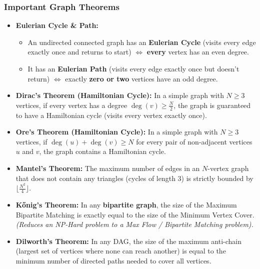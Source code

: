 \subsubsection*{Important Graph Theorems}
\begin{itemize}
    \item \textbf{Eulerian Cycle \& Path: } 
        \begin{itemize}
            \item An undirected connected graph has an \textbf{Eulerian Cycle} (visits every edge exactly once and returns to start) $\iff$ \textbf{every} vertex has an even degree.
            \item It has an \textbf{Eulerian Path} (visits every edge exactly once but doesn't return) $\iff$ exactly \textbf{zero or two} vertices have an odd degree.
        \end{itemize}
    \item \textbf{Dirac's Theorem (Hamiltonian Cycle): } In a simple graph with $N \ge 3$ vertices, if every vertex has a degree $\deg(v) \ge \frac{N}{2}$, the graph is guaranteed to have a Hamiltonian cycle (visits every vertex exactly once).
    \item \textbf{Ore's Theorem (Hamiltonian Cycle): } In a simple graph with $N \ge 3$ vertices, if $\deg(u) + \deg(v) \ge N$ for every pair of non-adjacent vertices $u$ and $v$, the graph contains a Hamiltonian cycle.
    \item \textbf{Mantel's Theorem: } The maximum number of edges in an $N$-vertex graph that does not contain any triangles (cycles of length 3) is strictly bounded by $\lfloor \frac{N^2}{4} \rfloor$.
    \item \textbf{Kőnig's Theorem: } In any \textbf{bipartite graph}, the size of the Maximum Bipartite Matching is exactly equal to the size of the Minimum Vertex Cover. \textit{(Reduces an NP-Hard problem to a Max Flow / Bipartite Matching problem).}
    \item \textbf{Dilworth's Theorem: } In any DAG, the size of the maximum anti-chain (largest set of vertices where none can reach another) is equal to the minimum number of directed paths needed to cover all vertices.
\end{itemize}